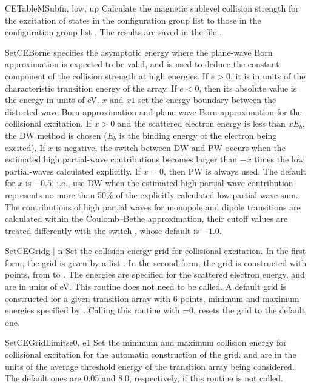 \begin{fundesc}{CETableMSub}{fn, low, up}
Calculate the magnetic sublevel collision strength for the excitation of states
in the configuration group list  to those in the configuration group
list . The results are saved in the file .
\end{fundesc}

\begin{fundesc}{SetCEBorn}{e}
 specifies the asymptotic energy where the plane-wave Born approximation
is expected to be valid, and is used to deduce the constant component of the
collision strength at high energies. If $e > 0$, it is in units of the
characteristic transition energy of the array. If $e < 0$, then its absolute
value is the energy in units of eV. $x$ and $x1$ set the energy boundary between
the distorted-wave Born approximation and plane-wave Born approximation for the
collisional excitation. If $x > 0$ and the scattered electron energy is less
than $xE_{b}$, the DW method is chosen ($E_{b}$ is the binding energy of the
electron being excited). If $x$ is negative, the switch between DW and PW occurs
when the estimated high partial-wave contributions becomes larger than $-x$
times the low partial-waves calculated explicitly. If $x=0$, then PW is always
used. The default for $x$ is $-0.5$, i.e., use DW when the estimated
high-partial-wave contribution represents no more than 50\% of the explicitly
calculated low-partial-wave sum. The contributions of high partial waves for
monopole and dipole transitions are calculated within the Coulomb--Bethe
approximation, their cutoff values are treated differently with the switch
, whose default is $-1.0$.
\end{fundesc}

\begin{fundesc}{SetCEGrid}{g $\mid$ n}
Set the collision energy grid for collisional excitation. In the first form, the
grid is given by a list . In the second form, the grid is constructed
with  points, from  to . The energies are specified for
the scattered electron energy, and are in units of eV. This routine does not
need to be called. A default grid is constructed for a given transition array
with 6 points, minimum and maximum energies specified by
. Calling this routine with =0, resets the grid
to the default one.
\end{fundesc}

\begin{fundesc}{SetCEGridLimits}{e0, e1}
Set the minimum and maximum collision energy for collisional excitation for the
automatic construction of the grid.  and  are in the units of
the average threshold energy of the transition array being considered. The
default ones are 0.05 and 8.0, respectively, if this routine is not called.
\end{fundesc}

